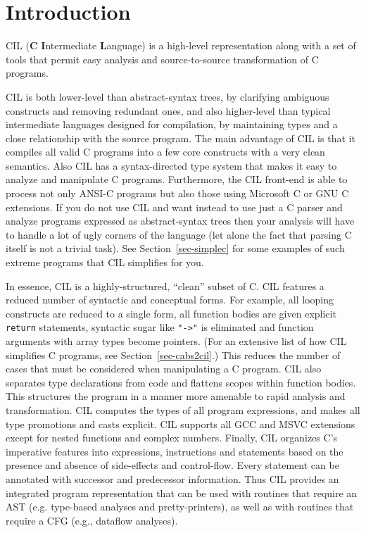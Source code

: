 \documentclass{article}
\def\secref#1{Section~\ref{sec-#1}}
\begin{document}
\maketitle

\section{Introduction}

 CIL ({\bf C} {\bf I}ntermediate {\bf L}anguage) is a high-level representation
along with a set of tools that permit easy analysis and source-to-source
transformation of C programs.

 CIL is both lower-level than abstract-syntax trees, by clarifying ambiguous
constructs and removing redundant ones, and also higher-level than typical
intermediate languages designed for compilation, by maintaining types and a
close relationship with the source program. The main advantage of CIL is that
it compiles all valid C programs into a few core constructs with a very clean
semantics. Also CIL has a syntax-directed type system that makes it easy to
analyze and manipulate C programs. Furthermore, the CIL front-end is able to
process not only ANSI-C programs but also those using Microsoft C or GNU C
extensions. If you do not use CIL and want instead to use just a C parser and
analyze programs expressed as abstract-syntax trees then your analysis will
have to handle a lot of ugly corners of the language (let alone the fact that
parsing C itself is not a trivial task). See \secref{simplec} for some
examples of such extreme programs that CIL simplifies for you.

 In essence, CIL is a highly-structured, ``clean'' subset of C. CIL features a
reduced number of syntactic and conceptual forms. For example, all looping
constructs are reduced to a single form, all function bodies are given
explicit {\tt return} statements, syntactic sugar like {\tt "->"} is
eliminated and function arguments with array types become pointers. (For an
extensive list of how CIL simplifies C programs, see \secref{cabs2cil}.)
This reduces the number of cases that must be considered when manipulating a C
program. CIL also separates type declarations from code and flattens scopes
within function bodies. This structures the program in a manner more amenable
to rapid analysis and transformation. CIL computes the types of all program
expressions, and makes all type promotions and casts explicit. CIL supports
all GCC and MSVC extensions except for nested functions and complex numbers.
Finally, CIL organizes C's imperative features into expressions, instructions
and statements based on the presence and absence of side-effects and
control-flow. Every statement can be annotated with successor and predecessor
information. Thus CIL provides an integrated program representation that can
be used with routines that require an AST (e.g. type-based analyses and
pretty-printers), as well as with routines that require a CFG (e.g., dataflow
analyses).
\end{document}
